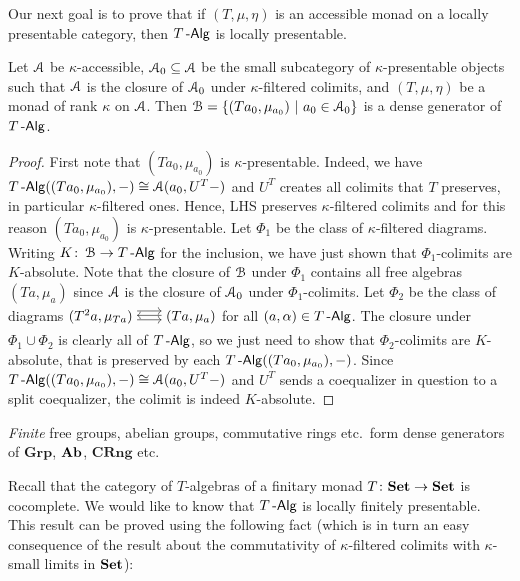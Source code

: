 \documentclass[a4paper,11pt,oneside,openany]{scrbook}
\begin{document}
Our next goal is to prove that if $(T,\mu,\eta)$ is an accessible monad on a locally presentable category, then $T\operatorname{-\mathsf{Alg}}$ is locally presentable.
\begin{prop}
    Let $\operatorname{\mathcal{A}}$ be $\kappa$-accessible, $\operatorname{\mathcal{A}}_0\subseteq\operatorname{\mathcal{A}}$ be the small subcategory of $\kappa$-presentable objects such that $\operatorname{\mathcal{A}}$ is the closure of $\operatorname{\mathcal{A}}_0$ under $\kappa$-filtered colimits, and $(T,\mu,\eta)$ be a monad of rank $\kappa$ on $\operatorname{\mathcal{A}}$. Then $\operatorname{\mathcal{B}}=\{ (Ta_0,\mu_{a_0})\ | \ a_0\in\operatorname{\mathcal{A}}_0 \}$ is a dense generator of $T\operatorname{-\mathsf{Alg}}$.
\end{prop}
\begin{proof}
	First note that $(Ta_0,\mu_{a_0})$ is $\kappa$-presentable. Indeed, we have $T\operatorname{-\mathsf{Alg}}((Ta_0,\mu_{a_0}),-)\cong\operatorname{\mathcal{A}}(a_0,U^T-)$ and $U^T$ creates all colimits that $T$ preserves, in particular $\kappa$-filtered ones. Hence, LHS preserves $\kappa$-filtered colimits and for this reason $(Ta_0,\mu_{a_0})$ is $\kappa$-presentable. Let $\Phi_1$  be the class of $\kappa$-filtered diagrams. Writing $K\colon\operatorname{\mathcal{B}}\to T\operatorname{-\mathsf{Alg}}$ for the inclusion, we have just shown that $\Phi_1$-colimits are $K$-absolute. Note that the closure of $\operatorname{\mathcal{B}}$ under $\Phi_1$ contains all free algebras $(Ta,\mu_a)$ since $\operatorname{\mathcal{A}}$ is the closure of $\operatorname{\mathcal{A}}_0$ under $\Phi_1$-colimits. Let $\Phi_2$ be the class of diagrams $\hspace{-1.5mm}\begin{tikzcd}
	(T^2a,\mu_{Ta})\hspace{-1.5mm}\arrow[r, shift right=.5ex, shorten <= .3em, shorten >= .3em]  \arrow[r, shift left=1ex, shorten <= .3em, shorten >= .3em] & \hspace{-1.5mm}(Ta,\mu_a)\arrow[l, shift right=.25ex, shorten <=.3em, shorten >=.3em]
	\end{tikzcd}\hspace{-1.5mm}$ for all $(a,\alpha)\in T\operatorname{-\mathsf{Alg}}$. The closure under $\Phi_1\cup\Phi_2$ is clearly all of $T\operatorname{-\mathsf{Alg}}$, so we just need to show that $\Phi_2$-colimits are $K$-absolute, that is preserved by each $T\operatorname{-\mathsf{Alg}}((Ta_0,\mu_{a_0}),-)$. Since $T\operatorname{-\mathsf{Alg}}((Ta_0,\mu_{a_0}),-)\cong\operatorname{\mathcal{A}}(a_0, U^T-)$ and $U^T$ sends a coequalizer in question to a split coequalizer, the colimit is indeed $K$-absolute.
\end{proof}
\begin{exmp}
	\emph{Finite} free groups, abelian groups, commutative rings etc.\ form dense generators of $\mathbf{Grp}$, ${\normalfont\textbf{Ab}}$, $\mathbf{CRng}$ etc.
\end{exmp}
Recall that the category of $T$-algebras of a finitary monad $T\colon{\normalfont\textbf{Set}}\to{\normalfont\textbf{Set}}$ is cocomplete. We would like to know that $T\operatorname{-\mathsf{Alg}}$ is locally finitely presentable. This result can be proved using the following fact (which is in turn an easy consequence of the result about the commutativity of $\kappa$-filtered colimits with $\kappa$-small limits in ${\normalfont\textbf{Set}}$):
\end{document}
